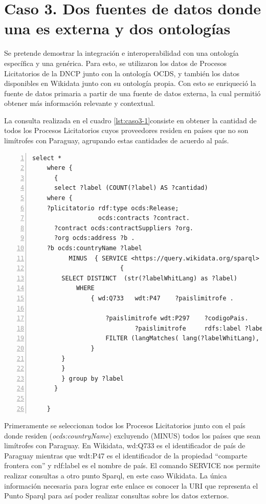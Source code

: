 \section{Caso 3. Dos fuentes de datos donde una es externa y dos ontologías}

Se pretende demostrar la integración e interoperabilidad con una ontología específica y una genérica. Para esto, se utilizaron los datos de Procesos Licitatorios de la DNCP junto con la ontología OCDS, y también los datos disponibles en Wikidata junto con su ontología propia. Con esto se enriqueció la fuente de datos primaria a partir de una fuente de datos externa, la cual permitió obtener más información relevante y contextual.

La consulta realizada en el cuadro  \ref{lst:caso3-1}consiste en obtener la cantidad de todos los Procesos Licitatorios cuyos proveedores residen en países que no son limítrofes con Paraguay, agrupando estas cantidades de acuerdo al país.

\noindent\begin{minipage}[c]{\textwidth}
\begin{lstlisting}[captionpos=b, caption=Integracion con una fuente de datos externa utilizando dos ontologias, label=lst:caso3-1,  numbers=left,  numberstyle=\tiny\color{mygray},
    basicstyle=\footnotesize\ttfamily,frame=single]
select *
    where {
      {
      select ?label (COUNT(?label) AS ?cantidad)
    where {
    ?plicitatorio rdf:type ocds:Release;
                  ocds:contracts ?contract.
      ?contract ocds:contractSuppliers ?org.
      ?org ocds:address ?b .
    ?b ocds:countryName ?label
          MINUS  { SERVICE <https://query.wikidata.org/sparql>
                        { 
        SELECT DISTINCT  (str(?labelWhitLang) as ?label)
            WHERE
                { wd:Q733   wdt:P47    ?paislimitrofe .
                
                    ?paislimitrofe wdt:P297    ?codigoPais.
                            ?paislimitrofe     rdfs:label ?labelWhitLang. 
                    FILTER (langMatches( lang(?labelWhitLang), "ES" ) )
                }        
        }
        }
        } group by ?label
      }
    
    }
 \end{lstlisting}
\end{minipage}

Primeramente se seleccionan todos los Procesos Licitatorios junto con el país donde residen (\textit{ocds:countryName}) excluyendo (MINUS) todos los países que sean limítrofes con Paraguay. En Wikidata, wd:Q733 es el identificador de país de Paraguay mientras que wdt:P47 es el identificador de la propiedad “comparte frontera con” y rdf:label es el nombre de país. El comando SERVICE nos permite realizar consultas a otro punto Sparql, en este caso Wikidata. La única información necesaria para lograr este enlace es conocer la URI que representa el Punto Sparql para así poder realizar consultas sobre los datos externos.


